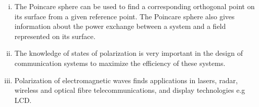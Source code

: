 \begin{enumerate}[(i)]
\item The Poincare sphere can be used to find a corresponding orthogonal point on its surface from a given reference point. The Poincare sphere also gives information about the power exchange between a system and a field represented on its surface.
\item The knowledge of states of polarization is very important in the design of communication systems to maximize the efficiency of these systems. 
\item  Polarization of electromagnetic waves finds applications in lasers, radar, wireless and optical fibre telecommunications, and display technologies e.g LCD.
\end{enumerate}